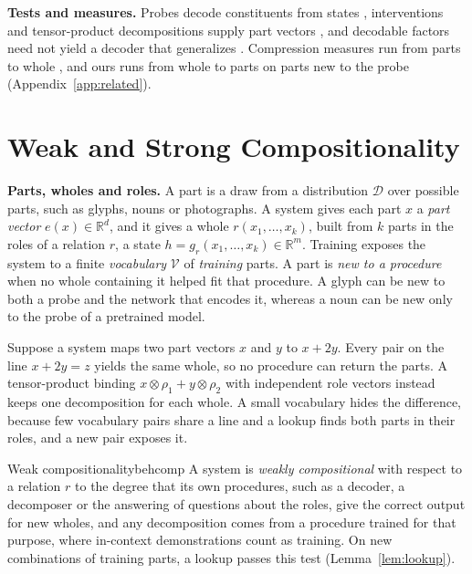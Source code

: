 \documentclass{article}
\theoremstyle{plain}
\theoremstyle{remark}
\newcommand{\R}{\mathbb{R}}
\newcommand{\D}{\mathcal{D}}
\newcommand{\Voc}{\mathcal{V}}
\begin{document}
\textbf{Tests and measures.} Probes decode constituents from states \citep{belinkov2022}, interventions and tensor-product decompositions supply part vectors \citep{geiger2021,mccoy2019}, and decodable factors need not yield a decoder that generalizes \citep{montero2021}. Compression measures run from parts to whole \citep{andreas2019,elmoznino2024}, and ours runs from whole to parts on parts new to the probe (Appendix~\ref{app:related}).

\section{Weak and Strong Compositionality}
\label{sec:definition}

\textbf{Parts, wholes and roles.} A part is a draw from a distribution $\D$ over possible parts, such as glyphs, nouns or photographs. A system gives each part $x$ a \emph{part vector} $e(x) \in \R^d$, and it gives a whole $r(x_1, \ldots, x_k)$, built from $k$ parts in the roles of a relation $r$, a state $h = g_r(x_1, \ldots, x_k) \in \R^m$. Training exposes the system to a finite \emph{vocabulary} $\Voc$ of \emph{training} parts. A part is \emph{new to a procedure} when no whole containing it helped fit that procedure. A glyph can be new to both a probe and the network that encodes it, whereas a noun can be new only to the probe of a pretrained model.

Suppose a system maps two part vectors $x$ and $y$ to $x + 2y$. Every pair on the line $x + 2y = z$ yields the same whole, so no procedure can return the parts. A tensor-product binding $x \otimes \rho_1 + y \otimes \rho_2$ with independent role vectors \citep{smolensky1990} instead keeps one decomposition for each whole. A small vocabulary hides the difference, because few vocabulary pairs share a line and a lookup finds both parts in their roles, and a new pair exposes it.

\begin{defbox}{Weak compositionality}{behcomp}
A system is \emph{weakly compositional} with respect to a relation $r$ to the degree that its own procedures, such as a decoder, a decomposer or the answering of questions about the roles, give the correct output for new wholes, and any decomposition comes from a procedure trained for that purpose, where in-context demonstrations count as training. On new combinations of training parts, a lookup passes this test (Lemma~\ref{lem:lookup}).
\end{defbox}
\end{document}
